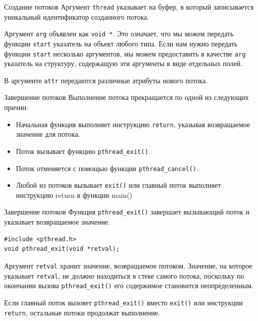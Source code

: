 \documentclass{beamer}
\begin{document}
\begin{frame}{Создание потоков}
    Аргумент \texttt{thread} указывает на буфер, в который записывается уникальный идентификатор созданного потока.
    
    Аргумент \texttt{arg} объявлен как \texttt{void *}. Это означает, что мы можем передать функции \texttt{start} указатель на объект любого типа. Если нам нужно передать функции \texttt{start} несколько аргументов, мы можем предоставить в качестве \texttt{arg} указатель на структуру, содержащую эти аргументы в виде отдельных полей.
    
    В аргументе \texttt{attr} передаются различные атрибуты нового потока.
\end{frame}

\begin{frame}{Завершение потоков}
    Выполнение потока прекращается по одной из следующих причин:
    \begin{itemize}
        \item Начальная функция выполняет инструкцию \texttt{return}, указывая возвращаемое значение для потока.
        \item Поток вызывает функцию \texttt{pthread\_exit()}.
        \item Поток отменяется с помощью функции \texttt{pthread\_cancel()}.
        \item Любой из потоков вызывает \texttt{exit()} или главный поток выполняет инструкцию return в функции main()
    \end{itemize}
\end{frame}

\begin{frame}[fragile]{Завершение потоков}
    Функция \texttt{pthread\_exit()} завершает вызывающий поток и указывает возвращаемое значение.

\begin{verbatim}
#include <pthread.h>
void pthread_exit(void *retval);
\end{verbatim}

    Аргумент \texttt{retval} хранит значение, возвращаемое потоком. Значение, на которое указывает \texttt{retval}, не должно находиться в стеке самого потока, поскольку по окончании вызова \texttt{pthread\_exit()} его содержимое становится неопределенным.
    
    Если главный поток вызовет \texttt{pthread\_exit()} вместо \texttt{exit()} или инструкции \texttt{return}, остальные потоки продолжат выполнение.
\end{frame}
\end{document}

